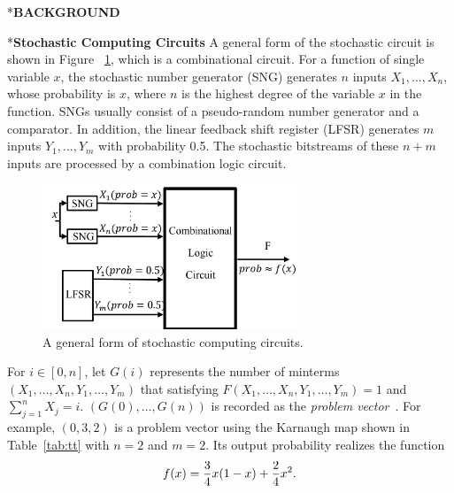 \documentclass[conference,letterpaper]{IEEEtran}
\makeatletter
\renewcommand{\section}{\@startsection{section}{1}{0mm}
    {-\baselineskip}{0.001\baselineskip}{\bf\leftline}}
\renewcommand{\subsection}{\@startsection{subsection}{1}{0mm}
	{-\baselineskip}{0.001\baselineskip}{\bf\leftline}}
\makeatother
\begin{document}
\vspace{2ex}

\section*{\textbf{\large BACKGROUND}}
\subsection*{\textbf{Stochastic Computing Circuits }}
A general form of the stochastic circuit is shown in Figure ~\ref{fig2}, which is a combinational circuit. For a function of single variable $x$, the stochastic number generator (SNG) generates $n$ inputs $X_{1}, \ldots, X_{n}$, whose probability is $x$, where $n$ is the highest degree of the variable $x$ in the function. SNGs usually consist of a pseudo-random number generator and a comparator. In addition, the linear feedback shift register (LFSR) generates $m$ inputs $Y_{1}, \ldots, Y_{m}$ with probability 0.5. The stochastic bitstreams of these $n+m$ inputs are processed by a combination logic circuit.

\begin{figure}[t]
	\centering
	\includegraphics[width=3in]{fig/sc.pdf}	
	\caption{\label{fig2}A general form of stochastic computing circuits.} \vspace{-2ex}
\end{figure}

For $i\in[0,n]$, let $G(i)$ represents the number of minterms $(X_{1}, \ldots, X_{n}, Y_{1}, \ldots, Y_{m})$ that satisfying $F(X_{1}, \ldots, X_{n}, Y_{1}, \ldots, Y_{m})=1$ and $\sum_{j=1}^{n} X_{j}=i$. $(G(0), \ldots, G(n))$ is recorded as the \emph{problem vector}~\cite{2}. For example, $(0, 3, 2)$ is a problem vector using the Karnaugh map shown in Table~\ref{tab:tt} with $n=2$ and $m=2$. Its output probability realizes the function
\begin{equation}
f(x)=\frac{3}{4} x(1-x)+\frac{2}{4} x^{2}.\vspace{-2ex}
\end{equation}
\end{document}
